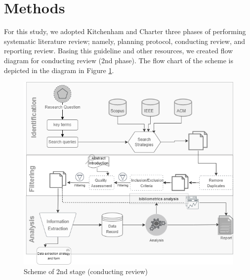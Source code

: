 
\section{Methods}
For this study, we adopted Kitchenham and Charter three phases of performing systematic literature review; namely, planning protocol, conducting review, and reporting review. Basing this guideline and other resources, we created flow diagram for conducting review (2nd phase). The flow chart of the scheme is depicted in the diagram in Figure \ref{fig:slr scheme}. 

\begin{figure}[ht]
    \centering
    \includegraphics[width=1\textwidth]{images/slrmethoddiagram.drawio.png}
    \caption{Scheme of 2nd stage (conducting review) }
    \label{fig:slr scheme}
\end{figure}


